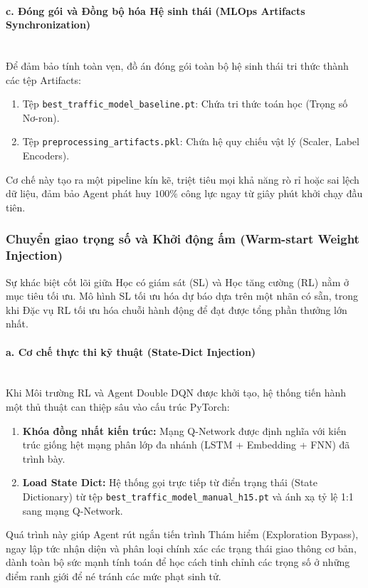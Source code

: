 \paragraph{c. Đóng gói và Đồng bộ hóa Hệ sinh thái (MLOps Artifacts Synchronization)} \mbox{} \\
Để đảm bảo tính toàn vẹn, đồ án đóng gói toàn bộ hệ sinh thái tri thức thành các tệp Artifacts:
\begin{enumerate}
    \item Tệp \texttt{best\_traffic\_model\_baseline.pt}: Chứa tri thức toán học (Trọng số Nơ-ron).
    \item Tệp \texttt{preprocessing\_artifacts.pkl}: Chứa hệ quy chiếu vật lý (Scaler, Label Encoders).
\end{enumerate}
Cơ chế này tạo ra một pipeline kín kẽ, triệt tiêu mọi khả năng rò rỉ hoặc sai lệch dữ liệu, đảm bảo Agent phát huy $100\%$ công lực ngay từ giây phút khởi chạy đầu tiên.

\subsubsection{Chuyển giao trọng số và Khởi động ấm (Warm-start Weight Injection)}

Sự khác biệt cốt lõi giữa Học có giám sát (SL) và Học tăng cường (RL) nằm ở mục tiêu tối ưu. Mô hình SL tối ưu hóa dự báo dựa trên một nhãn có sẵn, trong khi Đặc vụ RL tối ưu hóa chuỗi hành động để đạt được tổng phần thưởng lớn nhất.

\paragraph{a. Cơ chế thực thi kỹ thuật (State-Dict Injection)} \mbox{} \\
Khi Môi trường RL và Agent Double DQN được khởi tạo, hệ thống tiến hành một thủ thuật can thiệp sâu vào cấu trúc PyTorch:
\begin{enumerate}
    \item \textbf{Khóa đồng nhất kiến trúc:} Mạng Q-Network được định nghĩa với kiến trúc giống hệt mạng phân lớp đa nhánh (LSTM + Embedding + FNN) đã trình bày.
    \item \textbf{Load State Dict:} Hệ thống gọi trực tiếp từ điển trạng thái (State Dictionary) từ tệp \texttt{best\_traffic\_model\_manual\_h15.pt} và ánh xạ tỷ lệ 1:1 sang mạng Q-Network.
\end{enumerate}
Quá trình này giúp Agent rút ngắn tiến trình Thám hiểm (Exploration Bypass), ngay lập tức nhận diện và phân loại chính xác các trạng thái giao thông cơ bản, dành toàn bộ sức mạnh tính toán để học cách tinh chỉnh các trọng số ở những điểm ranh giới để né tránh các mức phạt sinh tử.
